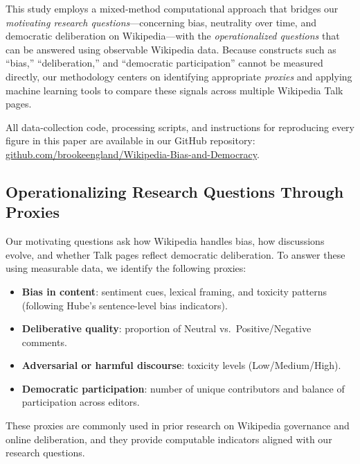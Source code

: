 
\label{sec:methodology}

This study employs a mixed-method computational approach that bridges our 
\textit{motivating research questions}---concerning bias, neutrality over time, and democratic 
deliberation on Wikipedia---with the \textit{operationalized questions} that can be answered 
using observable Wikipedia data. Because constructs such as ``bias,'' ``deliberation,'' and 
``democratic participation'' cannot be measured directly, our methodology centers on identifying 
appropriate \textit{proxies} and applying machine learning tools to compare these signals across 
multiple Wikipedia Talk pages.

All data-collection code, processing scripts, and instructions for reproducing every figure in 
this paper are available in our GitHub repository:  
\href{https://github.com/brookeengland/Wikipedia-Bias-and-Democracy}{github.com/brookeengland/Wikipedia-Bias-and-Democracy}.

\subsection{Operationalizing Research Questions Through Proxies}

Our motivating questions ask how Wikipedia handles bias, how discussions evolve, and whether 
Talk pages reflect democratic deliberation. To answer these using measurable data, we identify 
the following proxies:

\begin{itemize}
    \item \textbf{Bias in content}: sentiment cues, lexical framing, and toxicity patterns  
    (following Hube's sentence-level bias indicators).
    \item \textbf{Deliberative quality}: proportion of Neutral vs.\ Positive/Negative comments.
    \item \textbf{Adversarial or harmful discourse}: toxicity levels (Low/Medium/High).
    \item \textbf{Democratic participation}: number of unique contributors and balance of participation 
    across editors.
\end{itemize}

These proxies are commonly used in prior research on Wikipedia governance and online 
deliberation, and they provide computable indicators aligned with our research questions.

